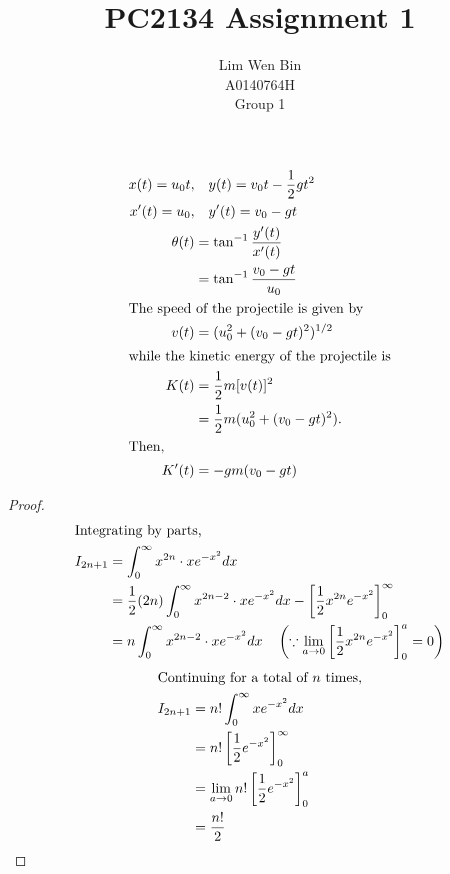 \documentclass[12pt]{article}
\newenvironment{problem}[2][Problem]{\begin{trivlist}
\item[\hskip \labelsep {\bfseries #1}\hskip \labelsep {\bfseries #2.}]}{\end{trivlist}}
\begin{document}
\title{PC2134 Assignment 1}
\author{Lim Wen Bin \\
A0140764H\\
Group 1}
\maketitle

\begin{problem}{1}
\end{problem}
\begin{align*}
	x(t) = u_0t,&\quad y(t) = v_0t - \frac{1}{2}gt^2\\
	x'(t) = u_0,&\quad y'(t) = v_0 - gt\\
	\theta(t) &= \tan^{-1}\frac{y'(t)}{x'(t)}\\
	&= \tan^{-1}\frac{v_0 - gt}{u_0}\\
	\shortintertext{The speed of the projectile is given by}
	v(t) &= (u_0^2 + (v_0-gt)^2)^{1/2}\\
	\shortintertext{while the kinetic energy of the projectile is}
	K(t) &= \frac{1}{2}m[v(t)]^2\\
	&= \frac{1}{2}m(u_0^2 + (v_0-gt)^2).\\
	\shortintertext{Then,}
	K'(t) &= -gm(v_0-gt)\\
\end{align*}

\begin{problem}{2.a}
\end{problem}
\begin{proof}
\begin{align*}
	\shortintertext{Integrating by parts,}
	I_{2n+1} &= \int_0^\infty x^{2n} \cdot x e^{-x^2} dx\\
	&= \frac{1}{2} (2n) \int_0^\infty x^{2n-2} \cdot x e^{-x^2} dx 
		- \left[ \frac{1}{2} x^{2n}e^{-x^2} \right]_0^\infty\\
	&= n \int_0^\infty x^{2n-2} \cdot x e^{-x^2} dx \quad 
		\left(\because \lim_{a\to 0} \left[ \frac{1}{2} x^{2n}e^{-x^2} \right]_0^a =
		0\right)\\
\end{align*}
\filbreak
\begin{align*}
	\shortintertext{Continuing for a total of $n$ times,}
	I_{2n+1} &= n! \int_0^\infty x e^{-x^2} dx\\
	&= n! \left[ \frac{1}{2} e^{-x^2} \right]_0^\infty\\
	&= \lim_{a\to0} n! \left[ \frac{1}{2} e^{-x^2} \right]_0^a\\
	&= \frac{n!}{2}
\end{align*}
\end{proof}
\end{document}
